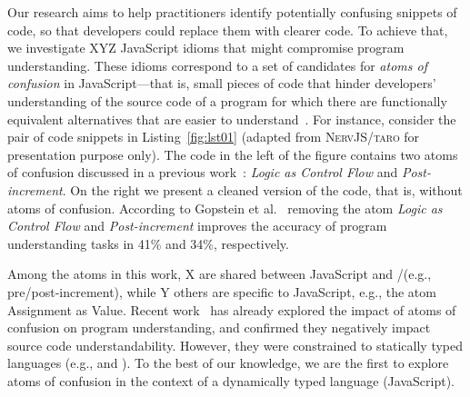 Our research aims to help practitioners identify potentially confusing snippets of code, so that
developers could replace them with clearer code.
To achieve that, we investigate {\color{red}XYZ} JavaScript idioms that
might compromise program understanding. These idioms correspond to a set of candidates for \emph{atoms of confusion} in
JavaScript---that is, small
pieces of code that hinder developers' understanding of the source code of a program
for which there are functionally equivalent alternatives that are easier
to understand~\cite{DBLP:conf/sigsoft/GopsteinIYDZYC17}. For instance, consider
the pair of code snippets in Listing~\ref{fig:lst01} (adapted from \textsc{NervJS/taro}
for presentation purpose only). The code in the left of the figure contains two atoms of confusion discussed in a previous work~\cite{DBLP:conf/sigsoft/GopsteinIYDZYC17}: \emph{Logic as Control Flow} and \emph{Post-increment}. On the right we present a cleaned version of the code, that is, without atoms of confusion. According to
Gopstein et al.~\cite{DBLP:conf/sigsoft/GopsteinIYDZYC17} removing
the atom \emph{Logic as Control Flow} and \emph{Post-increment} improves the accuracy of
program understanding tasks in  41\% and 34\%, respectively.

Among the atoms in this work, X are shared between JavaScript and \clang/\cpplang (e.g., pre/post-increment), while Y others are specific to JavaScript, e.g., the atom Assignment as Value.
Recent work~\cite{DBLP:journals/ese/MedeirosLAAKRG19,DBLP:conf/sigsoft/GopsteinIYDZYC17} has
already explored the impact of atoms of confusion on program understanding,
and confirmed they negatively impact source code understandability.
However, they were constrained to statically typed languages (e.g., \clang and \cpplang).
To the best of our knowledge, we are the first to explore atoms of confusion
in the context of a dynamically typed language (JavaScript).

